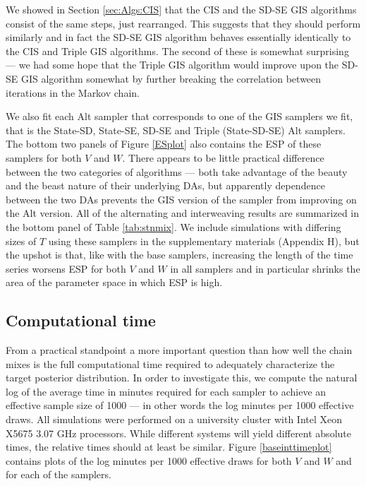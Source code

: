 \documentclass[12pt]{article}
\begin{document}
We showed in Section \ref{sec:Algs:CIS} that the CIS and the SD-SE GIS algorithms consist of the same steps, just rearranged. This suggests that they should perform similarly and in fact the SD-SE GIS algorithm behaves essentially identically to the CIS and Triple GIS algorithms. The second of these is somewhat surprising --- we had some hope that the Triple GIS algorithm would improve upon the SD-SE GIS algorithm somewhat by further breaking the correlation between iterations in the Markov chain.

We also fit each Alt sampler that corresponds to one of the GIS samplers we fit, that is the State-SD, State-SE, SD-SE and Triple (State-SD-SE) Alt samplers. The bottom two panels of Figure \ref{ESplot} also contains the ESP of these samplers for both $V$ and $W$. There appears to be little practical difference between the two categories of algorithms --- both take advantage of the beauty and the beast nature of their underlying DAs, but apparently dependence between the two DAs prevents the GIS version of the sampler from improving on the Alt version. All of the alternating and interweaving results are summarized in the bottom panel of Table \ref{tab:stnmix}. We include simulations with differing sizes of $T$ using these samplers in the supplementary materials (Appendix H), but the upshot is that, like with the base samplers, increasing the length of the time series worsens ESP for both $V$ and $W$ in all samplers and in particular shrinks the area of the parameter space in which ESP is high.

\subsection{Computational time}\label{sec:LLM:time}

From a practical standpoint a more important question than how well the chain mixes is the full computational time required to adequately characterize the target posterior distribution. In order to investigate this, we compute the natural log of the average time in minutes required for each sampler to achieve an effective sample size of 1000 --- in other words the log minutes per 1000 effective draws. All simulations were performed on a university cluster with Intel Xeon X5675 3.07 GHz processors. While different systems will yield different absolute times, the relative times should at least be similar. Figure \ref{baseinttimeplot} contains plots of the log minutes per 1000 effective draws for both $V$ and $W$ and for each of the samplers.
\end{document}
